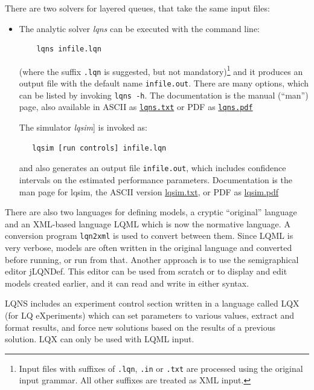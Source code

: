 \documentclass[11pt]{article}
\begin{document}
There are two solvers for layered queues, that take the same input files:
\begin{itemize}
\item The analytic solver \emph{lqns} can be executed with the command line:
\begin{verbatim}
    lqns infile.lqn
\end{verbatim}
  (where the suffix \texttt{.lqn} is suggested, but not
  mandatory)\footnote{Input files with suffixes of \texttt{.lqn},
    \texttt{.in} or \texttt{.txt} are processed using the original
    input grammar.  All other suffixes are treated as XML input.} and it
  produces an output file with the default name \texttt{infile.out}. There are
  many options, which can be listed by invoking \texttt{lqns -h}. The
  documentation is the manual (``man'') page, also available in ASCII as
  \href{http://www.sce.carleton.ca/rads/lqns/lqn-documentation/lqns.txt}{\texttt{lqns.txt}}
  or PDF as \href{http://www.sce.carleton.ca/rads/lqns/lqn-documentation/lqns.pdf}{\texttt{lqns.pdf}}

The simulator \emph{lqsim}] is invoked as:
\begin{verbatim}
   lqsim [run controls] infile.lqn
\end{verbatim}
and also generates an output file \texttt{infile.out}, which includes
confidence intervals on the estimated performance parameters.
Documentation is the man page for lqsim, the ASCII version
\href{http://www.sce.carleton.ca/rads/lqns/lqn-documentation/lqns.txt}{lqsim.txt},
or PDF as
\href{http://www.sce.carleton.ca/rads/lqns/lqn-documentation/lqns.pdf}{lqsim.pdf}
\end{itemize}

There are also two languages for defining models, a cryptic ``original'' language and an XML-based
language LQML which is now the normative language. A conversion program \texttt{lqn2xml} is
used to convert between them. Since LQML is very verbose, models are often written in the original
language and converted before running, or run from that. Another approach is to use the semigraphical
editor jLQNDef. This editor can be used from scratch or to display and edit models
created earlier, and it can read and write in either syntax.

LQNS includes an experiment control section written in a language called LQX (for LQ
eXperiments) which can set parameters to various values, extract and format results, and force new
solutions based on the results of a previous solution. LQX can only be
used with LQML input.
\end{document}
